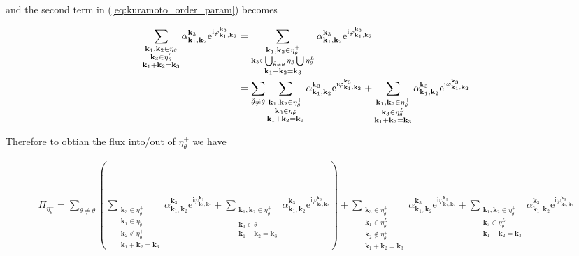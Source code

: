 \documentclass[9pt]{article}
\newcommand{\triad}[3]{\varphi_{#1, #2}^{#3}}                     %
\newcommand{\ii}{\mathrm{i}}      								  %
\newcommand{\e}{\mathrm{e}}      								  %
\newcommand{\alphakkk}[3]{\alpha_{\bfkn{#1}, \bfkn{#2}}^{\bfkn{#3}}}
\newcommand{\bfkn}[1]{\mathbf{k}_{#1}}								%
\begin{document}
and the second term in (\ref{eq:kuramoto_order_param}) becomes

\begin{align}
	\sum_{\substack{\bfkn{1}, \bfkn{2} \in \eta_{\theta} \\ \bfkn{3} \in \eta_{\theta}^{\prime} \\ \bfkn{1} + \bfkn{2} = \bfkn{3}}} \alphakkk{{1}}{2}{3}\e^{\ii \triad{\bfkn{1}}{\bfkn{2}}{\bfkn{3}}} &= \sum_{\substack{\bfkn{1}, \bfkn{2} \in \eta_{\theta}^{+} \\ \bfkn{3} \in \bigcup_{\tilde{\theta} \neq \theta} \eta_{\tilde{\theta}} \bigcup \eta_{\theta}^{L} \\ \bfkn{1} + \bfkn{2} = \bfkn{3}}} \alphakkk{{1}}{2}{3}\e^{\ii \triad{\bfkn{1}}{\bfkn{2}}{\bfkn{3}}} \notag \\
	&= \sum_{\tilde{\theta} \neq \theta} \sum_{\substack{\bfkn{1}, \bfkn{2} \in \eta_{\theta}^{+} \\ \bfkn{3} \in \eta_{\tilde{\theta}} \\ \bfkn{1} + \bfkn{2} = \bfkn{3}}} \alphakkk{{1}}{2}{3}\e^{\ii \triad{\bfkn{1}}{\bfkn{2}}{\bfkn{3}}} + \sum_{\substack{\bfkn{1}, \bfkn{2} \in \eta_{\theta}^{+} \\ \bfkn{3} \in \eta_{\theta}^{L} \\ \bfkn{1} + \bfkn{2} = \bfkn{3}}} \alphakkk{{1}}{2}{3}\e^{\ii \triad{\bfkn{1}}{\bfkn{2}}{\bfkn{3}}}
\end{align}

Therefore to obtian the flux into/out of $\eta_{\theta}^{+}$ we have

\begin{align}
	\Pi_{\eta_{\theta}^{+}} = \sum_{\tilde{\theta} \neq \theta} \left( \sum_{\substack{\bfkn{3} \in \eta_{\theta}^{+} \\ \bfkn{1} \in \eta_{\tilde{\theta}} \\ \bfkn{2} \notin \eta_{\theta}^{+} \\ \bfkn{1} + \bfkn{2} = \bfkn{3}}} \alphakkk{{1}}{2}{3}\e^{\ii \triad{\bfkn{1}}{\bfkn{2}}{\bfkn{3}}} + \sum_{\substack{\bfkn{1}, \bfkn{2} \in \eta_{\theta}^{+} \\ \bfkn{3} \in \mathcal{\tilde{\theta}} \\ \bfkn{1} + \bfkn{2} = \bfkn{3}}} \alphakkk{{1}}{2}{3}\e^{\ii \triad{\bfkn{1}}{\bfkn{2}}{\bfkn{3}}} \right) +  \sum_{\substack{\bfkn{3} \in \eta_{\theta}^{+} \\ \bfkn{1} \in \eta_{\theta}^{L} \\ \bfkn{2} \notin \eta_{\theta}^{+} \\ \bfkn{1} + \bfkn{2} = \bfkn{3}}} \alphakkk{{1}}{2}{3}\e^{\ii \triad{\bfkn{1}}{\bfkn{2}}{\bfkn{3}}} + \sum_{\substack{\bfkn{1}, \bfkn{2} \in \eta_{\theta}^{+} \\ \bfkn{3} \in \eta_{\theta}^{L} \\ \bfkn{1} + \bfkn{2} = \bfkn{3}}} \alphakkk{{1}}{2}{3}\e^{\ii \triad{\bfkn{1}}{\bfkn{2}}{\bfkn{3}}}
\end{align}
\end{document}

